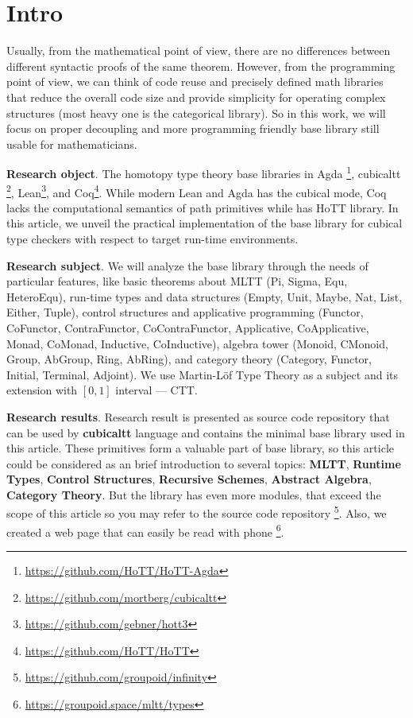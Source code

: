 \documentclass{article}
\begin{document}
\newpage
\tableofcontents
\newpage

\section{Intro}

Usually, from the mathematical point of view, there are no differences between
different syntactic proofs of the same theorem. However, from the programming point of view, we can think of code reuse and precisely defined math libraries that reduce
the overall code size and provide simplicity for operating complex
structures (most heavy one is the categorical library). So in this work, we will focus
on proper decoupling and more programming friendly base library still usable
for mathematicians.

{\bf Research object}. The homotopy type theory base libraries in
Agda \footnote{\url{https://github.com/HoTT/HoTT-Agda}},
cubicaltt \footnote{\url{https://github.com/mortberg/cubicaltt}},
Lean\footnote{\url{ https://github.com/gebner/hott3}}, and
Coq\footnote{\url{https://github.com/HoTT/HoTT}}.
While modern Lean and Agda has the cubical mode, Coq lacks the computational semantics of path primitives
while has HoTT library. In this article, we unveil the practical implementation of the
base library for cubical type checkers with respect to target run-time environments.

{\bf Research subject}. We will analyze the base library through the needs of particular features,
like basic theorems about MLTT (Pi, Sigma, Equ, HeteroEqu), run-time types and data
structures (Empty, Unit, Maybe, Nat, List, Either, Tuple), control structures and applicative programming
(Functor, CoFunctor, ContraFunctor, CoContraFunctor, Applicative, CoApplicative, Monad,
CoMonad, Inductive, CoInductive), algebra tower (Monoid, CMonoid, Group, AbGroup, Ring, AbRing),
and category theory (Category, Functor, Initial, Terminal, Adjoint).
We use Martin-Löf Type Theory as a subject and its extension with $[0,1]$ interval --- CTT.

{\bf Research results}. Research result is presented as source code repository that can be used by
{\bf cubicaltt} language and contains the minimal base library used in this article.
These primitives form a valuable part of base library, so this article could be
considered as an brief introduction to several topics: {\bf MLTT}, {\bf Runtime Types},
{\bf Control Structures},  {\bf Recursive Schemes},
{\bf Abstract Algebra}, {\bf Category Theory}.
But the library has even more modules, that
exceed the scope of this article so you may refer to the source code
repository \footnote{\url{https://github.com/groupoid/infinity}}.
Also, we created a web page that can easily be read with phone \footnote{\url{https://groupoid.space/mltt/types}}.
\end{document}
